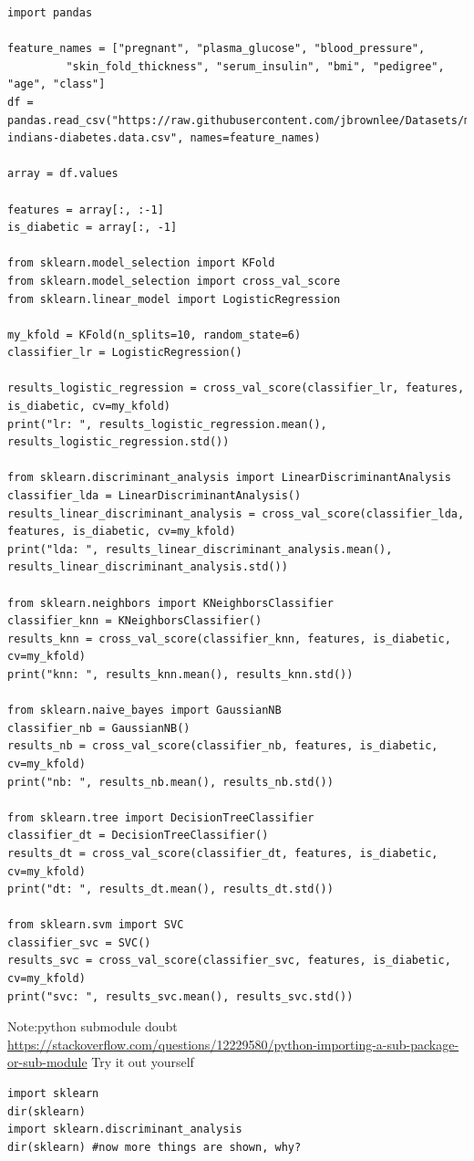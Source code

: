 \documentclass[11pt]{article}
\begin{document}
\begin{verbatim}
import pandas

feature_names = ["pregnant", "plasma_glucose", "blood_pressure", 
		 "skin_fold_thickness", "serum_insulin", "bmi", "pedigree", "age", "class"]
df = pandas.read_csv("https://raw.githubusercontent.com/jbrownlee/Datasets/master/pima-indians-diabetes.data.csv", names=feature_names)

array = df.values

features = array[:, :-1]
is_diabetic = array[:, -1]

from sklearn.model_selection import KFold
from sklearn.model_selection import cross_val_score
from sklearn.linear_model import LogisticRegression

my_kfold = KFold(n_splits=10, random_state=6)
classifier_lr = LogisticRegression()

results_logistic_regression = cross_val_score(classifier_lr, features, is_diabetic, cv=my_kfold)
print("lr: ", results_logistic_regression.mean(), results_logistic_regression.std())

from sklearn.discriminant_analysis import LinearDiscriminantAnalysis
classifier_lda = LinearDiscriminantAnalysis()
results_linear_discriminant_analysis = cross_val_score(classifier_lda, features, is_diabetic, cv=my_kfold)
print("lda: ", results_linear_discriminant_analysis.mean(), results_linear_discriminant_analysis.std())

from sklearn.neighbors import KNeighborsClassifier
classifier_knn = KNeighborsClassifier()
results_knn = cross_val_score(classifier_knn, features, is_diabetic, cv=my_kfold)
print("knn: ", results_knn.mean(), results_knn.std())

from sklearn.naive_bayes import GaussianNB
classifier_nb = GaussianNB()
results_nb = cross_val_score(classifier_nb, features, is_diabetic, cv=my_kfold)
print("nb: ", results_nb.mean(), results_nb.std())

from sklearn.tree import DecisionTreeClassifier
classifier_dt = DecisionTreeClassifier()
results_dt = cross_val_score(classifier_dt, features, is_diabetic, cv=my_kfold)
print("dt: ", results_dt.mean(), results_dt.std())

from sklearn.svm import SVC
classifier_svc = SVC()
results_svc = cross_val_score(classifier_svc, features, is_diabetic, cv=my_kfold)
print("svc: ", results_svc.mean(), results_svc.std())

\end{verbatim}

Note:python submodule doubt
\url{https://stackoverflow.com/questions/12229580/python-importing-a-sub-package-or-sub-module}
Try it out yourself
\begin{verbatim}
import sklearn
dir(sklearn)
import sklearn.discriminant_analysis
dir(sklearn) #now more things are shown, why?
\end{verbatim}
\end{document}
